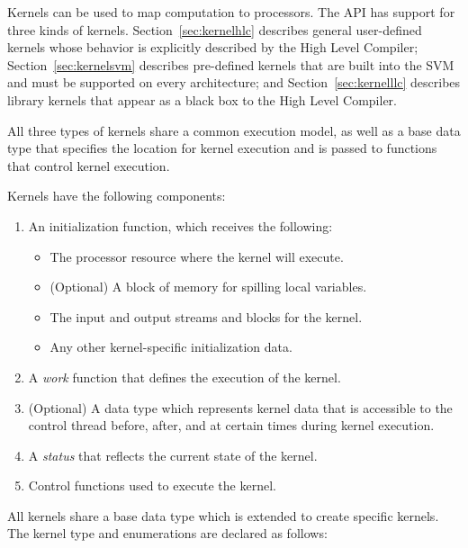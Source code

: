 Kernels can be used to map computation to processors.  The API has
support for three kinds of kernels. Section~\ref{sec:kernelhlc}
describes general user-defined kernels whose behavior is explicitly
described by the High Level Compiler; Section~\ref{sec:kernelsvm}
describes pre-defined kernels that are built into the SVM and must be
supported on every architecture; and Section~\ref{sec:kernelllc}
describes library kernels that appear as a black box to the High Level 
Compiler.

All three types of kernels share a common execution model, as well as
a base data type that specifies the location for kernel execution and
is passed to functions that control kernel execution.

Kernels have the following components:

\begin{enumerate}

\item An initialization function, which receives the following: 
\begin{itemize}
\item The processor resource where the kernel will execute. 
\item (Optional) A block of memory for spilling local variables. 
\item The input and output streams and blocks for the kernel. 
\item Any other kernel-specific initialization data. 
\end{itemize}

\item A {\it work} function that defines the execution of the kernel.

\item (Optional) A data type which represents kernel data that is
accessible to the control thread before, after, and at certain times
during kernel execution.

\item A {\it status} that reflects the current state of the kernel.

\item Control functions used to execute the kernel.

\end{enumerate}


All kernels share a base data type which is extended to create
specific kernels. The kernel type and enumerations are declared as
follows:

